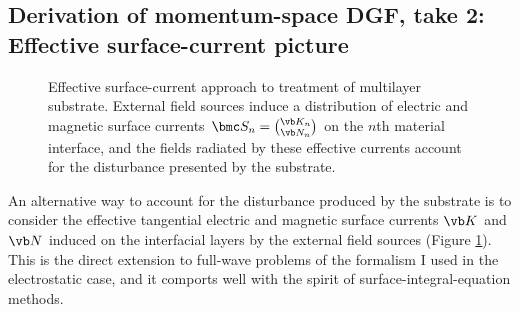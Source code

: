 \documentclass[letterpaper]{article}
\begin{document}

\newpage
\subsection{Derivation of momentum-space DGF, take 2: Effective surface-current picture}
\label{SurfaceCurrentSection}

\begin{figure}[t]
\begin{center}
\caption{Effective surface-current approach to treatment of
multilayer substrate. External field sources induce a distribution
of electric and magnetic surface currents $\bmc S_n={\vb K_n \choose \vb N_n}$
on the $n$th material interface, and the fields radiated by these
effective currents account for the disturbance presented by
the substrate.}
\label{SurfaceCurrentFigure}
\end{center}
\end{figure}
An alternative way to account for the disturbance produced by the
substrate is to consider the effective tangential electric and magnetic
surface currents $\vb K$ and $\vb N$ induced on the interfacial 
layers by the external field sources 
(Figure \ref{SurfaceCurrentFigure}). This is the direct extension
to full-wave problems of the formalism I used in the electrostatic
case, and it comports well with the spirit of
surface-integral-equation methods.
\end{document}
